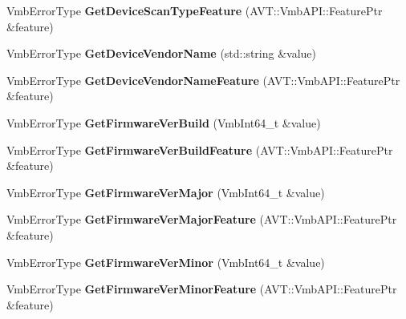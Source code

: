\begin{DoxyCompactItemize}
\item 
\hypertarget{classMakoCamera_a4358061d742142e2ffc44c9ae1940551}{Vmb\-Error\-Type {\bfseries Get\-Device\-Scan\-Type\-Feature} (A\-V\-T\-::\-Vmb\-A\-P\-I\-::\-Feature\-Ptr \&feature)}\label{classMakoCamera_a4358061d742142e2ffc44c9ae1940551}

\item 
\hypertarget{classMakoCamera_acf4c23ff185398a312d7a6410d7c2a33}{Vmb\-Error\-Type {\bfseries Get\-Device\-Vendor\-Name} (std\-::string \&value)}\label{classMakoCamera_acf4c23ff185398a312d7a6410d7c2a33}

\item 
\hypertarget{classMakoCamera_a5e7fe32fa83ec3818ff2c03ba72cefb1}{Vmb\-Error\-Type {\bfseries Get\-Device\-Vendor\-Name\-Feature} (A\-V\-T\-::\-Vmb\-A\-P\-I\-::\-Feature\-Ptr \&feature)}\label{classMakoCamera_a5e7fe32fa83ec3818ff2c03ba72cefb1}

\item 
\hypertarget{classMakoCamera_a6564611584484f651b2c6c13161cabaa}{Vmb\-Error\-Type {\bfseries Get\-Firmware\-Ver\-Build} (Vmb\-Int64\-\_\-t \&value)}\label{classMakoCamera_a6564611584484f651b2c6c13161cabaa}

\item 
\hypertarget{classMakoCamera_a37e7e8fa73ba5ba5458b1b8261312076}{Vmb\-Error\-Type {\bfseries Get\-Firmware\-Ver\-Build\-Feature} (A\-V\-T\-::\-Vmb\-A\-P\-I\-::\-Feature\-Ptr \&feature)}\label{classMakoCamera_a37e7e8fa73ba5ba5458b1b8261312076}

\item 
\hypertarget{classMakoCamera_ab3a50a5bae21780f426b50245bf107b0}{Vmb\-Error\-Type {\bfseries Get\-Firmware\-Ver\-Major} (Vmb\-Int64\-\_\-t \&value)}\label{classMakoCamera_ab3a50a5bae21780f426b50245bf107b0}

\item 
\hypertarget{classMakoCamera_a13d17030d5f29e2c81079e6135c2e4f1}{Vmb\-Error\-Type {\bfseries Get\-Firmware\-Ver\-Major\-Feature} (A\-V\-T\-::\-Vmb\-A\-P\-I\-::\-Feature\-Ptr \&feature)}\label{classMakoCamera_a13d17030d5f29e2c81079e6135c2e4f1}

\item 
\hypertarget{classMakoCamera_a048778ac5a2aa55bcf924c252649d4ae}{Vmb\-Error\-Type {\bfseries Get\-Firmware\-Ver\-Minor} (Vmb\-Int64\-\_\-t \&value)}\label{classMakoCamera_a048778ac5a2aa55bcf924c252649d4ae}

\item 
\hypertarget{classMakoCamera_a92371a903e7ba144dbd65adaf6cc703b}{Vmb\-Error\-Type {\bfseries Get\-Firmware\-Ver\-Minor\-Feature} (A\-V\-T\-::\-Vmb\-A\-P\-I\-::\-Feature\-Ptr \&feature)}\label{classMakoCamera_a92371a903e7ba144dbd65adaf6cc703b}


\end{DoxyCompactItemize}
